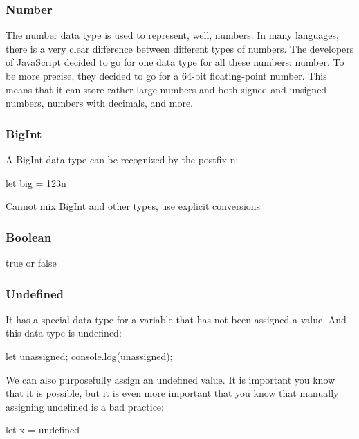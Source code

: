 \documentclass{report}
\begin{document}
    \bigbreak \noindent 
    \subsubsection{Number}
    \bigbreak \noindent 
    The number data type is used to represent, well, numbers. In many languages, there
    is a very clear difference between different types of numbers. The developers of
    JavaScript decided to go for one data type for all these numbers: number. To be more
    precise, they decided to go for a 64-bit floating-point number. This means that it can
    store rather large numbers and both signed and unsigned numbers, numbers with
    decimals, and more.

    \bigbreak \noindent 
    \subsubsection{BigInt}
    \bigbreak \noindent 
    A BigInt data type can be recognized by the postfix n:
    \bigbreak \noindent 
    \begin{jscode}
    let big = 123n
    \end{jscode}
    \bigbreak \noindent 
    Cannot mix BigInt and other types, use explicit conversions

    \bigbreak \noindent 
    \subsubsection{Boolean}
    \bigbreak \noindent 
    true or false

    \bigbreak \noindent 
    \subsubsection{Undefined}
    \bigbreak \noindent 
    It has a special data type for a variable that has not been assigned a value. And this data type is undefined:
    \bigbreak \noindent 
    \begin{jscode}
        let unassigned;
        console.log(unassigned);
    \end{jscode}
    \bigbreak \noindent 
    We can also purposefully assign an undefined value. It is important you know that it is possible, but it is even more important that you know that manually assigning undefined is a bad practice:
    \bigbreak \noindent 
    \begin{jscode}
    let x = undefined
    \end{jscode}
\end{document}
